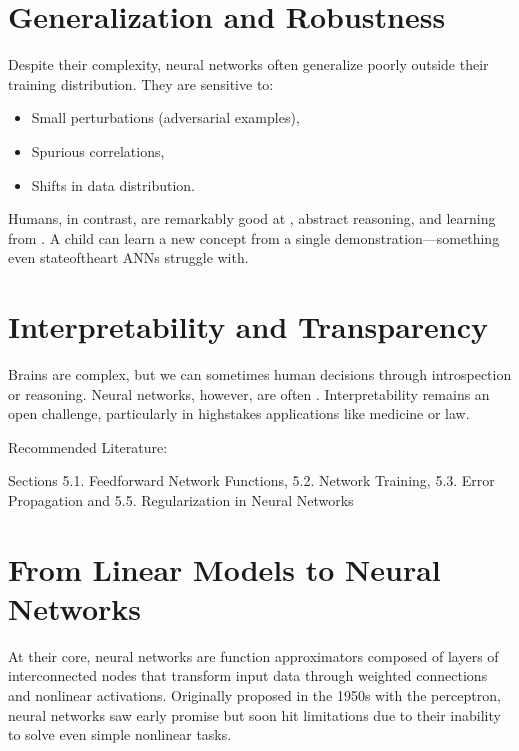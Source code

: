\documentclass[letterpaper,10pt,english]{jupyterBook}
\begin{document}
\section{Generalization and Robustness}
\label{\detokenize{neuralnets:generalization-and-robustness}}
\sphinxAtStartPar
Despite their complexity, neural networks often generalize poorly outside their training distribution. They are sensitive to:
\begin{itemize}
\item {} 
\sphinxAtStartPar
Small perturbations (adversarial examples),

\item {} 
\sphinxAtStartPar
Spurious correlations,

\item {} 
\sphinxAtStartPar
Shifts in data distribution.

\end{itemize}

\sphinxAtStartPar
Humans, in contrast, are remarkably good at , abstract reasoning, and learning from . A child can learn a new concept from a single demonstration—something even state\sphinxhyphen{}of\sphinxhyphen{}the\sphinxhyphen{}art ANNs struggle with.


\section{Interpretability and Transparency}
\label{\detokenize{neuralnets:interpretability-and-transparency}}
\sphinxAtStartPar
Brains are complex, but we can sometimes  human decisions through introspection or reasoning. Neural networks, however, are often . Interpretability remains an open challenge, particularly in high\sphinxhyphen{}stakes applications like medicine or law.

\sphinxAtStartPar
Recommended Literature:

\sphinxAtStartPar
{} Sections 5.1. Feed\sphinxhyphen{}forward Network Functions, 5.2. Network Training,  5.3. Error Propagation and 5.5. Regularization in Neural Networks

\sphinxstepscope


\section{From Linear Models to Neural Networks}
\label{\detokenize{neuralnets_intro:from-linear-models-to-neural-networks}}\label{\detokenize{neuralnets_intro::doc}}
\sphinxAtStartPar
At their core, neural networks are function approximators composed of layers of interconnected nodes that transform input data through weighted connections and nonlinear activations. Originally proposed in the 1950s with the perceptron, neural networks saw early promise but soon hit limitations due to their inability to solve even simple non\sphinxhyphen{}linear tasks.
\end{document}
